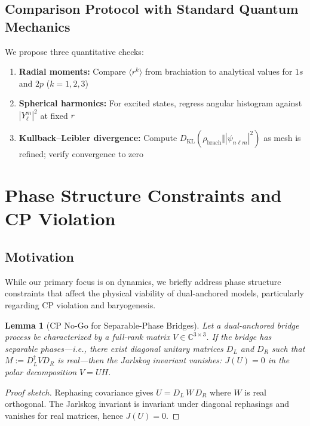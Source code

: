 \documentclass[11pt]{article}
\theoremstyle{plain}
\newtheorem{lemma}[theorem]{Lemma}
\theoremstyle{definition}
\begin{document}
\subsection{Comparison Protocol with Standard Quantum Mechanics}

We propose three quantitative checks:
\begin{enumerate}
  \item \textbf{Radial moments:} Compare $\langle r^k\rangle$ from brachiation to analytical values for $1s$ and $2p$ ($k=1,2,3$)
  \item \textbf{Spherical harmonics:} For excited states, regress angular histogram against $|Y_\ell^m|^2$ at fixed $r$
  \item \textbf{Kullback–Leibler divergence:} Compute $D_{\mathrm{KL}}(\rho_{\text{brach}}\Vert |\psi_{n\ell m}|^2)$ as mesh is refined; verify convergence to zero
\end{enumerate}

\section{Phase Structure Constraints and CP Violation}
\label{sec:cp-violation}

\subsection{Motivation}

While our primary focus is on dynamics, we briefly address phase structure constraints that affect the physical viability of dual-anchored models, particularly regarding CP violation and baryogenesis.

\begin{lemma}[CP No-Go for Separable-Phase Bridges]\label{lem:cp-nogo}
  Let a dual-anchored bridge process be characterized by a full-rank matrix $V \in \mathbb{C}^{3\times 3}$. If the bridge has separable phases—i.e., there exist diagonal unitary matrices $D_L$ and $D_R$ such that $M:=D_L^\dagger V D_R$ is real—then the Jarlskog invariant vanishes: $J(U)=0$ in the polar decomposition $V=UH$.
\end{lemma}

\begin{proof}[Proof sketch]
  Rephasing covariance gives $U=D_L\,W\,D_R$ where $W$ is real orthogonal. The Jarlskog invariant is invariant under diagonal rephasings and vanishes for real matrices, hence $J(U)=0$.
\end{proof}
\end{document}
